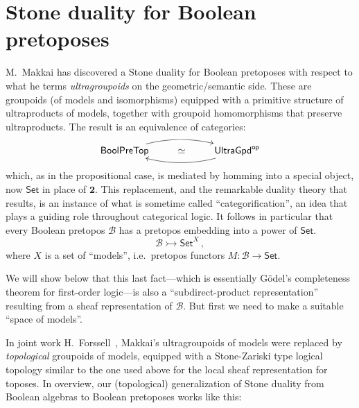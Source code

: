 \documentclass[12pt]{article}
\newcommand{\Set}{\ensuremath{\mathsf{Set}}}
\newcommand{\mono}{\ensuremath{\rightarrowtail}}
\theoremstyle{remark}
\theoremstyle{definition}
\begin{document}
\section{Stone duality for Boolean pretoposes}

M.~Makkai \cite{M} has discovered a Stone duality for Boolean pretoposes with respect to what he terms \emph{ultragroupoids} on the geometric/semantic side. These are groupoids (of models and isomorphisms) equipped with a primitive structure of ultraproducts of models, together with groupoid homomorphisms that preserve ultraproducts.  The result is an equivalence of categories:

\[
\xymatrix{ 
\mathsf{BoolPreTop}  \ar@/{}^{1pc}/[rr]     & \simeq &  \mathsf{UltraGpd}^{\mathsf{op}}  \ar@/{}^{1pc}/[ll] \\
} 
\]
\smallskip

\noindent which, as in the propositional case, is mediated by homming into a special object, now $\Set$ in place of $\mathbf{2}$.  This replacement, and the remarkable duality theory that results, is an instance of what is sometime called ``categorification'', an idea that plays a guiding role throughout categorical logic.  It follows in particular that every Boolean pretopos $\mathcal{B}$ has a pretopos embedding into a power of $\Set$.
\[
\mathcal{B} \mono \Set^X\,,
\]
where $X$ is a set of ``models'', i.e.\ pretopos functors $M : \mathcal{B}\to \Set$.  

We will show below that this last fact---which is essentially G\"odel's completeness theorem for first-order logic---is also a ``subdirect-product representation'' resulting from a sheaf representation of $\mathcal{B}$.  But first we need to make a suitable ``space of models''.

In joint work H.~Forssell~\cite{AF}, Makkai's ultragroupoids of models were replaced by \emph{topological} groupoids of models, equipped with a Stone-Zariski type logical topology similar to the one used above for the local sheaf representation for toposes. In overview, our (topological) generalization of Stone duality from Boolean algebras to Boolean pretoposes works like this:
\medskip
\end{document}
